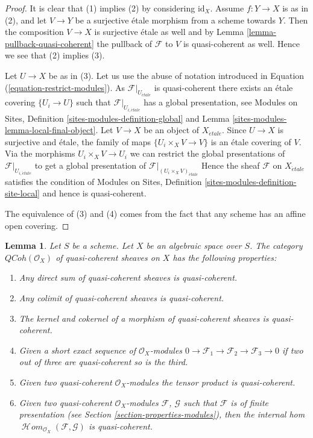 \documentclass{stacks-project}
\theoremstyle{plain}
\newtheorem{lemma}[subsection]{Lemma}
\theoremstyle{definition}
\theoremstyle{remark}
\numberwithin{equation}{subsection}
\def\SheafHom{\mathop{\mathcal{H}\!\mathit{om}}\nolimits}
\def\etale{{\acute{e}tale}}
\def\QCoh{\mathit{QCoh}}
\begin{document}
\begin{proof}
It is clear that (1) implies (2) by considering $\text{id}_X$.
Assume $f : Y \to X$ is as in (2), and let $V \to Y$ be a surjective
\'etale morphism from a scheme towards $Y$. Then the composition $V \to X$ is
surjective \'etale as well
and by Lemma \ref{lemma-pullback-quasi-coherent} the pullback of $\mathcal{F}$
to $V$ is quasi-coherent as well. Hence we see that (2) implies (3).

\medskip\noindent
Let $U \to X$ be as in (3). Let us use the abuse of notation introduced
in Equation (\ref{equation-restrict-modules}).
As $\mathcal{F}|_{U_\etale}$ is quasi-coherent there exists an
\'etale covering $\{U_i \to U\}$ such that
$\mathcal{F}|_{U_{i, \etale}}$ has a global presentation, see
Modules on Sites, Definition \ref{sites-modules-definition-global} and
Lemma \ref{sites-modules-lemma-local-final-object}.
Let $V \to X$ be an object of $X_\etale$. Since $U \to X$ is
surjective and \'etale, the family of maps $\{U_i \times_X V \to V\}$ is an
\'etale covering
of $V$. Via the morphisms $U_i \times_X V \to U_i$ we can restrict the
global presentations of $\mathcal{F}|_{U_{i, \etale}}$ to get a global
presentation of $\mathcal{F}|_{(U_i \times_X V)_\etale}$
Hence the sheaf $\mathcal{F}$ on $X_\etale$ satisfies the condition of
Modules on Sites, Definition \ref{sites-modules-definition-site-local}
and hence is quasi-coherent.

\medskip\noindent
The equivalence of (3) and (4) comes from the fact that any scheme has
an affine open covering.
\end{proof}

\begin{lemma}
\label{lemma-properties-quasi-coherent}
Let $S$ be a scheme. Let $X$ be an algebraic space over $S$.
The category $\QCoh(\mathcal{O}_X)$ of quasi-coherent sheaves on $X$
has the following properties:
\begin{enumerate}
\item Any direct sum of quasi-coherent sheaves is quasi-coherent.
\item Any colimit of quasi-coherent sheaves is quasi-coherent.
\item The kernel and cokernel of a morphism of quasi-coherent sheaves
is quasi-coherent.
\item Given a short exact sequence of $\mathcal{O}_X$-modules
$0 \to \mathcal{F}_1 \to \mathcal{F}_2 \to \mathcal{F}_3 \to 0$
if two out of three are quasi-coherent so is the third.
\item Given two quasi-coherent $\mathcal{O}_X$-modules
the tensor product is quasi-coherent.
\item Given two quasi-coherent $\mathcal{O}_X$-modules
$\mathcal{F}$, $\mathcal{G}$ such that $\mathcal{F}$
is of finite presentation (see
Section \ref{section-properties-modules}),
then the internal hom
$\SheafHom_{\mathcal{O}_X}(\mathcal{F}, \mathcal{G})$
is quasi-coherent.
\end{enumerate}
\end{lemma}
\end{document}
